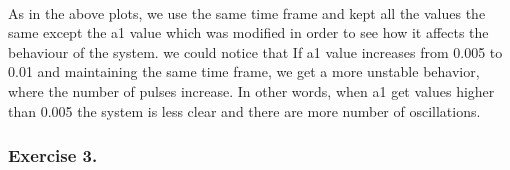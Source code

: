 \documentclass[11pt]{article}
\begin{document}
    \begin{center}
    \end{center}
    { \hspace*{\fill} \\}
    
    \begin{center}
    \end{center}
    { \hspace*{\fill} \\}
    
    \begin{center}
    \end{center}
    { \hspace*{\fill} \\}
    
    \begin{center}
    \end{center}
    { \hspace*{\fill} \\}
    
    \begin{center}
    \end{center}
    { \hspace*{\fill} \\}
    
    \begin{center}
    \end{center}
    { \hspace*{\fill} \\}
    
    As in the above plots, we use the same time frame and kept all the
values the same except the a1 value which was modified in order to see
how it affects the behaviour of the system. we could notice that If a1
value increases from 0.005 to 0.01 and maintaining the same time frame,
we get a more unstable behavior, where the number of pulses increase. In
other words, when a1 get values higher than 0.005 the system is less
clear and there are more number of oscillations.

    \subsubsection{Exercise 3. }\label{exercise-3.}
\end{document}
